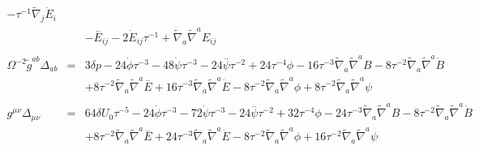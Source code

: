 \documentclass[10pt,letterpaper]{article}
\numberwithin{equation}{section}
\begin{document}
\begin{eqnarray}
-  \tau^{-1} \tilde{\nabla}_{j}\dot{E}_{i}
\nonumber\\
&&- \overset{..}{E}_{ij}
- 2 \dot{E}_{ij} \tau^{-1}
+ \tilde{\nabla}_{a}\tilde{\nabla}^{a}E_{ij}
\\ \nonumber\\
\Omega^{-2}\tilde g^{ab}\Delta_{ab} &=& 
3 \delta p
- 24 \dot{\phi} \tau^{-3}
- 48 \dot{\psi} \tau^{-3}
- 24 \overset{..}{\psi} \tau^{-2}
+ 24 \tau^{-4} \phi
- 16 \tau^{-3} \tilde{\nabla}_{a}\tilde{\nabla}^{a}B
- 8 \tau^{-2} \tilde{\nabla}_{a}\tilde{\nabla}^{a}\dot{B}\nonumber\\
&& + 8 \tau^{-2} \tilde{\nabla}_{a}\tilde{\nabla}^{a}\overset{..}{E}
+ 16 \tau^{-3} \tilde{\nabla}_{a}\tilde{\nabla}^{a}\dot{E}
- 8 \tau^{-2} \tilde{\nabla}_{a}\tilde{\nabla}^{a}\phi
+ 8 \tau^{-2} \tilde{\nabla}_{a}\tilde{\nabla}^{a}\psi
\\ \nonumber\\
g^{\mu\nu}\Delta_{\mu\nu} &=& 
64 \delta U_{0}{} \tau^{-5}
- 24 \dot{\phi} \tau^{-3}
- 72 \dot{\psi} \tau^{-3}
- 24 \overset{..}{\psi} \tau^{-2}
+ 32 \tau^{-4} \phi
- 24 \tau^{-3} \tilde{\nabla}_{a}\tilde{\nabla}^{a}B
- 8 \tau^{-2} \tilde{\nabla}_{a}\tilde{\nabla}^{a}\dot{B}\nonumber\\
&& + 8 \tau^{-2} \tilde{\nabla}_{a}\tilde{\nabla}^{a}\overset{..}{E}
+ 24 \tau^{-3} \tilde{\nabla}_{a}\tilde{\nabla}^{a}\dot{E}
- 8 \tau^{-2} \tilde{\nabla}_{a}\tilde{\nabla}^{a}\phi
+ 16 \tau^{-2} \tilde{\nabla}_{a}\tilde{\nabla}^{a}\psi
\end{eqnarray}
%
%
\end{document}
